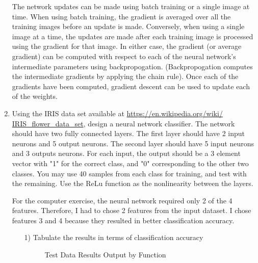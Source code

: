 \documentclass[fleqn]{article}
\begin{document}
\begin{enumerate}
		The network updates can be made using batch training or a single image at time. When using batch training, the gradient is averaged over all the training images before an update is made. Conversely, when using a single image at a time, the updates are made after each training image is processed using the gradient for that image. In either case, the gradient (or average gradient) can be computed with respect to each of the neural network's intermediate parameters using backpropogation. (Backpropogation computes the intermediate gradients by applying the chain rule). Once each of the gradients have been computed, gradient descent can be used to update each of the weights.
		
		\item Using the IRIS data set available at \href{https://en.wikipedia.org/wiki/IRIS_flower_data_set}{https://en.wikipedia.org/wiki/\\IRIS\_flower\_data\_set}, design a neural network classifier. The network should have two fully connected layers. The first layer should have 2 input neurons and 5 output neurons. The second layer should have 5 input neurons and 3 outputs neurons. For each input, the output should be a 3 element vector with "1" for the correct class, and "0" corresponding to the other two classes. You may use 40 samples from each class for training, and test with the remaining. Use the ReLu function as the nonlinearity between the layers.
		
		For the computer exercise, the neural network required only 2 of the 4 features. Therefore, I had to chose 2 features from the input dataset. I chose features 3 and 4 because they resulted in better classification accuracy.
		
		\pagebreak
		\begin{enumerate}
			\item[1)] Tabulate the results in terms of classification accuracy
			
			\begin{figure}[H]
				\centerline{}
				\caption{Test Data Results Output by Function}
				\label{test_data_results}
			\end{figure}
		

\end{enumerate}
\end{enumerate}
\end{document}
